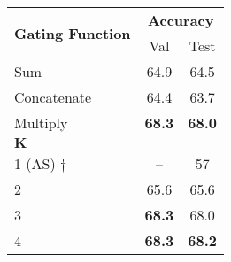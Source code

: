 \documentclass[11pt,a4paper]{article}
\begin{document}
\begin{table*}[ht]
{\begin{tabular}{@{}l|c|c@{}}
\toprule
\multirow{2}{*}{\textbf{Gating Function}} & \multicolumn{2}{c}{\textbf{Accuracy}} \\ \cmidrule(l){2-3} 
                                          & Val                & Test              \\ \midrule
Sum                                       & 64.9               & 64.5             \\
Concatenate                               & 64.4               & 63.7              \\
Multiply                                  & \textbf{68.3}               & \textbf{68.0}              \\ \midrule


$\mathbf{K}$	&	&	\\ \midrule
1 (AS) $\dagger$                   & --               & 57             \\
2			                               & 65.6               & 65.6              \\
3                                & \textbf{68.3}               & 68.0              \\
4                                & \textbf{68.3}               & \textbf{68.2}              \\\bottomrule
\end{tabular}
}
\end{table*}
\end{document}
